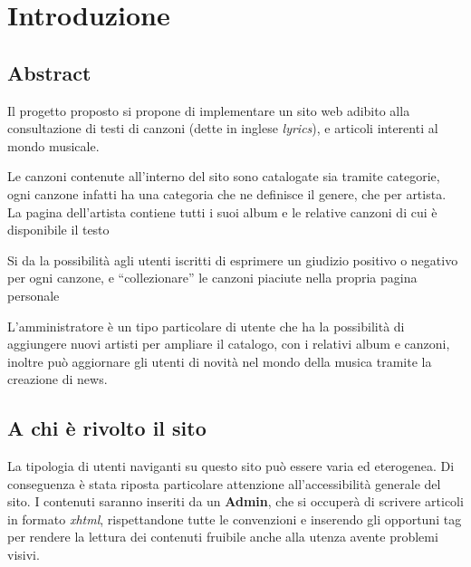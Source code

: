 \section{Introduzione}

\subsection{Abstract}
Il progetto proposto si propone di implementare un sito web adibito alla consultazione di testi di canzoni (dette in inglese \textit{lyrics}), e articoli interenti al mondo musicale.

Le canzoni contenute all'interno del sito sono catalogate sia tramite categorie, ogni canzone infatti ha una categoria che ne definisce il genere, che per artista.
La pagina dell'artista contiene tutti i suoi album e le relative canzoni di cui è disponibile il testo

Si da la possibilità agli utenti iscritti di esprimere un giudizio positivo o negativo per ogni canzone, e ``collezionare'' le canzoni piaciute nella propria pagina personale

L'amministratore è un tipo particolare di utente che ha la possibilità di aggiungere nuovi artisti per ampliare il catalogo, con i relativi album e canzoni, inoltre può aggiornare gli utenti di novità nel mondo della musica tramite la creazione di news.


\subsection{A chi è rivolto il sito}
La tipologia di utenti naviganti su questo sito può essere varia ed eterogenea. Di conseguenza è stata riposta particolare attenzione all'accessibilità generale del sito. I contenuti saranno inseriti da un \textbf{Admin}, che si occuperà di scrivere articoli in formato \textit{xhtml}, rispettandone tutte le convenzioni e inserendo gli opportuni tag per rendere la lettura dei contenuti fruibile anche alla utenza avente problemi visivi.
